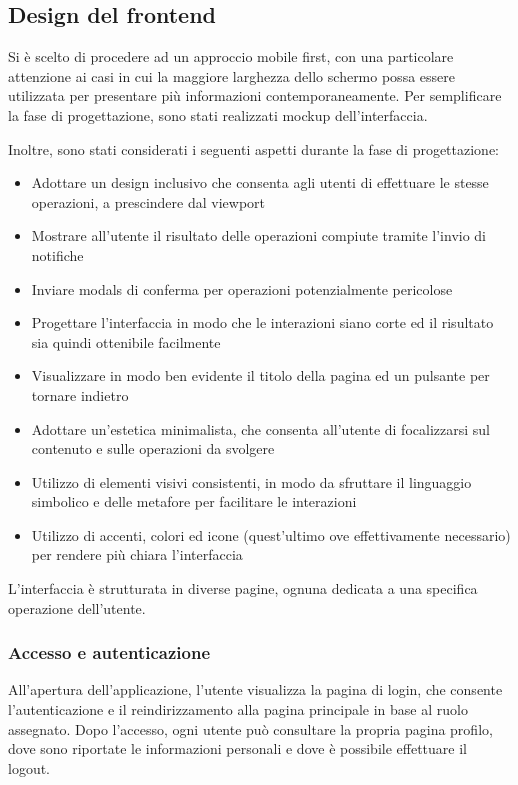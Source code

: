 \documentclass{report}
\begin{document}
\subsection{Design del frontend}
\par Si è scelto di procedere ad un approccio mobile first, con una particolare attenzione ai casi in cui la maggiore larghezza dello schermo possa essere utilizzata per presentare più informazioni contemporaneamente. Per semplificare la fase di progettazione, sono stati realizzati mockup dell'interfaccia.
\par Inoltre, sono stati considerati i seguenti aspetti durante la fase di progettazione:
\begin{itemize}
    \item Adottare un design inclusivo che consenta agli utenti di effettuare le stesse operazioni, a prescindere dal viewport
    \item Mostrare all'utente il risultato delle operazioni compiute tramite l'invio di notifiche
    \item Inviare modals di conferma per operazioni potenzialmente pericolose
    \item Progettare l'interfaccia in modo che le interazioni siano corte ed il risultato sia quindi ottenibile facilmente
    \item Visualizzare in modo ben evidente il titolo della pagina ed un pulsante per tornare indietro
    \item Adottare un'estetica minimalista, che consenta all'utente di focalizzarsi sul contenuto e sulle operazioni da svolgere
    \item Utilizzo di elementi visivi consistenti, in modo da sfruttare il linguaggio simbolico e delle metafore per facilitare le interazioni
    \item Utilizzo di accenti, colori ed icone (quest'ultimo ove effettivamente necessario) per rendere più chiara l'interfaccia
\end{itemize}
\par L'interfaccia è strutturata in diverse pagine, ognuna dedicata a una specifica operazione dell'utente.
\subsubsection{Accesso e autenticazione}
\par All'apertura dell'applicazione, l'utente visualizza la pagina di login, che consente l'autenticazione e il reindirizzamento alla pagina principale in base al ruolo assegnato. Dopo l'accesso, ogni utente può consultare la propria pagina profilo, dove sono riportate le informazioni personali e dove è possibile effettuare il logout.
\end{document}
